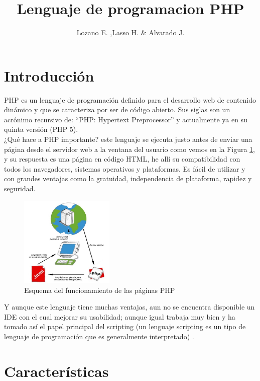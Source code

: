 \documentclass[11pt]{article} %
\title{Lenguaje de programacion PHP}
\author{Lozano E. ,Lasso H. \& Alvarado J.}
\begin{document}
\maketitle

\section{Introducción}
PHP es un lenguaje de programación definido para el desarrollo web de contenido dinámico y que se caracteriza por ser de código abierto. Sus siglas son un acrónimo recursivo de: “PHP: Hypertext Preprocessor” y actualmente ya en su quinta versión (PHP 5).
\\¿Qué hace a PHP importante? este lenguaje se ejecuta justo antes de enviar una página desde el servidor web a la ventana del usuario como vemos en la Figura \ref{fig:funcionamiento}, y su respuesta es una página en código HTML, he allí su compatibilidad con todos los navegadores, sistemas operativos y plataformas.  Es fácil de utilizar y con grandes ventajas como la gratuidad, independencia de plataforma, rapidez y seguridad. 

\begin{figure}[H]
  \centering
    \includegraphics[width=0.4\textwidth]{Imagenes/diagrama-php}
  \caption{Esquema del funcionamiento de las páginas PHP}
  \label{fig:funcionamiento}
\end{figure}
 Y aunque este lenguaje tiene muchas ventajas, aun no se encuentra disponible un IDE con el cual mejorar su usabilidad; aunque igual trabaja muy bien y ha tomado así el papel principal del scripting (un lenguaje scripting es un tipo de lenguaje de programación que es generalmente interpretado) \cite{[1]}.

\section{Características}
\end{document}
